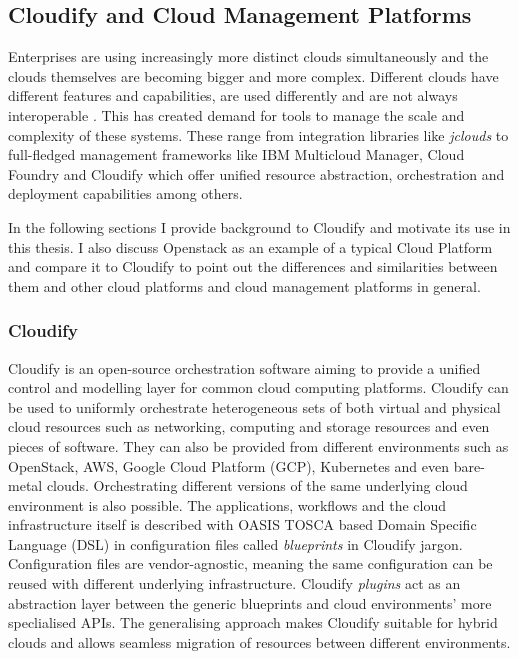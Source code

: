 \subsection{Cloudify and Cloud Management Platforms}

Enterprises are using increasingly more distinct clouds simultaneously \cite{stateofthecloud} and the clouds themselves are becoming bigger and more complex. Different clouds have different features and capabilities, are used differently and are not always interoperable \cite{multicloudprovisioning}. This has created demand for tools to manage the scale and complexity of these systems. These range from integration libraries like \textit{jclouds} \cite{jclouds} to full-fledged management frameworks like IBM Multicloud Manager, Cloud Foundry and Cloudify \cite{ibmmulticloud,cloudfoundry,cloudify} which offer unified resource abstraction, orchestration and deployment capabilities among others.

In the following sections I provide background to Cloudify and motivate its use in this thesis. I also discuss Openstack as an example of a typical Cloud Platform and compare it to Cloudify to point out the differences and similarities between them and other cloud platforms and cloud management platforms in general.

\subsubsection{Cloudify}

Cloudify \cite{cloudify} is an open-source orchestration software aiming to provide a unified control and modelling layer for common cloud computing platforms. Cloudify can be used to uniformly orchestrate heterogeneous sets of both virtual and physical cloud resources such as networking, computing and storage resources and even pieces of software. They can also be provided from different environments such as OpenStack, AWS, Google Cloud Platform (GCP), Kubernetes and even bare-metal clouds. Orchestrating different versions of the same underlying cloud environment is also possible. The applications, workflows and the cloud infrastructure itself is described with OASIS TOSCA \cite{Tosca} based Domain Specific Language (DSL) in configuration files called \textit{blueprints} in Cloudify jargon. Configuration files are vendor-agnostic, meaning the same configuration can be reused with different underlying infrastructure. Cloudify \textit{plugins} act as an abstraction layer between the generic blueprints and cloud environments' more speclialised APIs. The generalising approach makes Cloudify suitable for hybrid clouds and allows seamless migration of resources between different environments.

